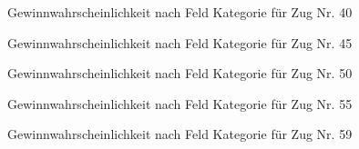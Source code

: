 \begin{figure}[ht]
\centering
{}
\caption{Gewinnwahrscheinlichkeit nach Feld Kategorie für Zug Nr. 40}
\label{fig:win-pro-turn-40}
\end{figure}
\begin{figure}[ht]
\centering
{}
\caption{Gewinnwahrscheinlichkeit nach Feld Kategorie für Zug Nr. 45}
\label{fig:win-pro-turn-45}
\end{figure}
\begin{figure}[ht]
\centering
{}
\caption{Gewinnwahrscheinlichkeit nach Feld Kategorie für Zug Nr. 50}
\label{fig:win-pro-turn-50}
\end{figure}
\begin{figure}[ht]
\centering
{}
\caption{Gewinnwahrscheinlichkeit nach Feld Kategorie für Zug Nr. 55}
\label{fig:win-pro-turn-55}
\end{figure}
\begin{figure}[ht]
\centering
{}
\caption{Gewinnwahrscheinlichkeit nach Feld Kategorie für Zug Nr. 59}
\label{fig:win-pro-turn-59}
\end{figure}